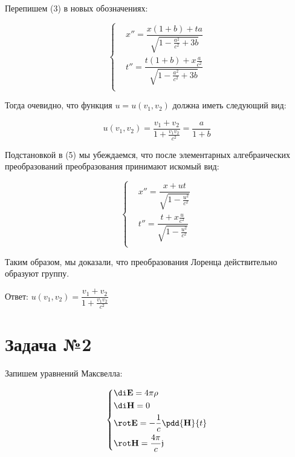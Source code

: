 \documentclass[12pt]{kiarticle}
\begin{document}
Перепишем (3) в новых обозначениях:

\begin{equation}
\left\{
\begin{aligned}
&x'' = \dfrac{ x(1+b) + ta }
{ \sqrt{1-\frac{a^2}{c^2} + 3b} } \\
&t'' = \dfrac{t(1+b) + x\frac{a}{c^2} }
{\sqrt{1-\frac{a^2}{c^2} + 3b } }\\
\end{aligned}
\right.
\end{equation}

Тогда очевидно, что функция $ u = u(v_1,v_2) $ должна иметь следующий вид: 

\begin{equation}
u(v_1,v_2) = \dfrac{v_1+v_2}{1+\frac{v_1v_2}{c^2}} = \dfrac{a}{1 + b} 
\end{equation}

Подстановкой в (5) мы убеждаемся, что после элементарных  алгебраических преобразований преобразования принимают искомый вид:

\begin{equation}
\left\{
\begin{aligned}
&x'' = \dfrac{ x+ ut }
{ \sqrt{1-\frac{u^2}{c^2}} } \\
&t'' = \dfrac{t + x\frac{u}{c^2} }
{\sqrt{1-\frac{u^2}{c^2} } }\\
\end{aligned}
\right.
\end{equation}

Таким образом, мы доказали, что преобразования Лоренца действительно образуют группу.

\begin{solv}
{
	Ответ: $ u(v_1,v_2) = \dfrac{v_1+v_2}{1+\frac{v_1v_2}{c^2}}$
}
\end{solv}




\section{Задача №2}

Запишем уравнений Максвелла:

\begin{equation}
\left\{
\begin{aligned}
& \di \mathbf{E} = 4\pi\rho \\
& \di \textbf{H} = 0 \\
& \rot \mathbf{E} = -\dfrac{1}{c}\pdd{\mathbf{H}}{t} \\
& \rot \mathbf{H} = \dfrac{4\pi}{c}\mathbf{\mathfrak{j}} \\
\end{aligned}
\right.
\end{equation}
\end{document}
